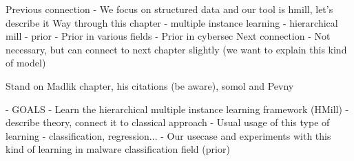 

Previous connection
- We focus on structured data and our tool is hmill, let's describe it
Way through this chapter
- multiple instance learning
- hierarchical mill
- prior
    - Prior in various fields
    - Prior in cybersec
Next connection
- Not necessary, but can connect to next chapter slightly (we want to explain this kind of model)

Stand on Madlik chapter, his citations (be aware), somol and Pevny


- GOALS 
- Learn the hierarchical multiple instance learning framework (HMill)
- describe theory, connect it to classical approach
- Usual usage of this type of learning - classification, regression...
- Our usecase and experiments with this kind of learning in malware classification field (prior)